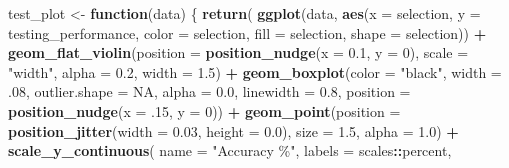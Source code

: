 \documentclass[
]{book}
\newenvironment{Shaded}{\begin{snugshade}}{\end{snugshade}}
\newcommand{\AttributeTok}[1]{\textcolor[rgb]{0.13,0.29,0.53}{#1}}
\newcommand{\ConstantTok}[1]{\textcolor[rgb]{0.56,0.35,0.01}{#1}}
\newcommand{\ControlFlowTok}[1]{\textcolor[rgb]{0.13,0.29,0.53}{\textbf{#1}}}
\newcommand{\DecValTok}[1]{\textcolor[rgb]{0.00,0.00,0.81}{#1}}
\newcommand{\FloatTok}[1]{\textcolor[rgb]{0.00,0.00,0.81}{#1}}
\newcommand{\FunctionTok}[1]{\textcolor[rgb]{0.13,0.29,0.53}{\textbf{#1}}}
\newcommand{\NormalTok}[1]{#1}
\newcommand{\OtherTok}[1]{\textcolor[rgb]{0.56,0.35,0.01}{#1}}
\newcommand{\SpecialCharTok}[1]{\textcolor[rgb]{0.81,0.36,0.00}{\textbf{#1}}}
\newcommand{\StringTok}[1]{\textcolor[rgb]{0.31,0.60,0.02}{#1}}
\begin{document}
\begin{Shaded}
\begin{Highlighting}[]
\NormalTok{test\_plot }\OtherTok{\textless{}{-}} \ControlFlowTok{function}\NormalTok{(data) \{ }\FunctionTok{return}\NormalTok{(}
    \FunctionTok{ggplot}\NormalTok{(data,}
    \FunctionTok{aes}\NormalTok{(}\AttributeTok{x =}\NormalTok{ selection, }\AttributeTok{y =}\NormalTok{ testing\_performance, }\AttributeTok{color =}\NormalTok{ selection,}
                \AttributeTok{fill =}\NormalTok{ selection, }\AttributeTok{shape =}\NormalTok{ selection)) }\SpecialCharTok{+}
    \FunctionTok{geom\_flat\_violin}\NormalTok{(}\AttributeTok{position =} \FunctionTok{position\_nudge}\NormalTok{(}\AttributeTok{x =} \FloatTok{0.1}\NormalTok{, }\AttributeTok{y =} \DecValTok{0}\NormalTok{),}
                    \AttributeTok{scale =} \StringTok{"width"}\NormalTok{, }\AttributeTok{alpha =} \FloatTok{0.2}\NormalTok{, }\AttributeTok{width =} \FloatTok{1.5}\NormalTok{) }\SpecialCharTok{+}
    \FunctionTok{geom\_boxplot}\NormalTok{(}\AttributeTok{color =} \StringTok{"black"}\NormalTok{, }\AttributeTok{width =}\NormalTok{ .}\DecValTok{08}\NormalTok{, }\AttributeTok{outlier.shape =} \ConstantTok{NA}\NormalTok{,}
                \AttributeTok{alpha =} \FloatTok{0.0}\NormalTok{, }\AttributeTok{linewidth =} \FloatTok{0.8}\NormalTok{,}
                \AttributeTok{position =} \FunctionTok{position\_nudge}\NormalTok{(}\AttributeTok{x =}\NormalTok{ .}\DecValTok{15}\NormalTok{, }\AttributeTok{y =} \DecValTok{0}\NormalTok{)) }\SpecialCharTok{+}
    \FunctionTok{geom\_point}\NormalTok{(}\AttributeTok{position =} \FunctionTok{position\_jitter}\NormalTok{(}\AttributeTok{width =} \FloatTok{0.03}\NormalTok{,}
                \AttributeTok{height =} \FloatTok{0.0}\NormalTok{), }\AttributeTok{size =} \FloatTok{1.5}\NormalTok{, }\AttributeTok{alpha =} \FloatTok{1.0}\NormalTok{) }\SpecialCharTok{+}
    \FunctionTok{scale\_y\_continuous}\NormalTok{(}
    \AttributeTok{name =} \StringTok{"Accuracy \%"}\NormalTok{,}
    \AttributeTok{labels =}\NormalTok{ scales}\SpecialCharTok{::}\NormalTok{percent,}


\end{Highlighting}
\end{Shaded}
\end{document}
